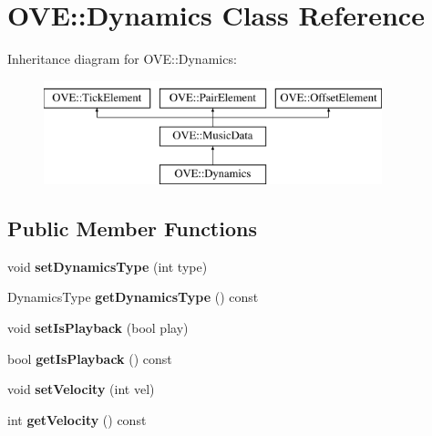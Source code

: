 \hypertarget{class_o_v_e_1_1_dynamics}{}\section{O\+VE\+:\+:Dynamics Class Reference}
\label{class_o_v_e_1_1_dynamics}
Inheritance diagram for O\+VE\+:\+:Dynamics\+:\begin{figure}[H]
\begin{center}
\leavevmode
\includegraphics[height=3.000000cm]{class_o_v_e_1_1_dynamics}
\end{center}
\end{figure}
\subsection*{Public Member Functions}
\begin{DoxyCompactItemize}
\item 
\mbox{\label{class_o_v_e_1_1_dynamics_a9d5f05154fbc8b00fad38533fc3b69db}} 
void {\bfseries set\+Dynamics\+Type} (int type)
\item 
\mbox{\label{class_o_v_e_1_1_dynamics_a33b41bfcec449841863573d26a1e1272}} 
Dynamics\+Type {\bfseries get\+Dynamics\+Type} () const
\item 
\mbox{\label{class_o_v_e_1_1_dynamics_a30ec0e3e48daa5455cf26f2cd18a61df}} 
void {\bfseries set\+Is\+Playback} (bool play)
\item 
\mbox{\label{class_o_v_e_1_1_dynamics_a9be8a22c2c8ac4fae9a4a40e19675a3f}} 
bool {\bfseries get\+Is\+Playback} () const
\item 
\mbox{\label{class_o_v_e_1_1_dynamics_aebd749b64e5b7c8146e054e4ff2d1567}} 
void {\bfseries set\+Velocity} (int vel)
\item 
\mbox{\label{class_o_v_e_1_1_dynamics_abb209204c8621ec699a039a9a937a394}} 
int {\bfseries get\+Velocity} () const
\end{DoxyCompactItemize}
